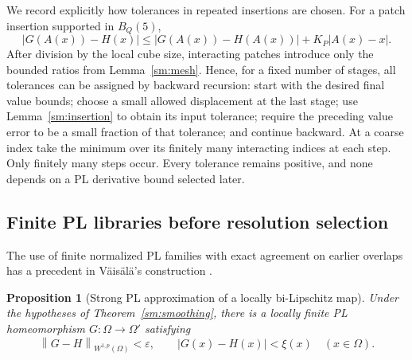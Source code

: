 \documentclass[11pt]{article}
\numberwithin{equation}{section}
\newtheorem{proposition}[theorem]{Proposition}
\theoremstyle{definition}
\theoremstyle{remark}
\begin{document}
We record explicitly how tolerances in repeated insertions are chosen.
For a patch insertion supported in $B_Q(5)$,
\begin{equation}
 \label{sm:value-update}
 |G(A(x))-H(x)|
 \le |G(A(x))-H(A(x))|+K_P|A(x)-x|.
\end{equation}
After division by the local cube size, interacting patches introduce
only the bounded ratios from Lemma~\ref{sm:mesh}.  Hence, for a fixed
number of stages, all tolerances can be assigned by backward
recursion: start with the desired final value bounds; choose a small
allowed displacement at the last stage; use
Lemma~\ref{sm:insertion} to obtain its input tolerance; require the
preceding value error to be a small fraction of that tolerance; and
continue backward.  At a coarse index take the minimum over its
finitely many interacting indices at each step.  Only finitely many
steps occur.  Every tolerance remains positive, and none depends on a
PL derivative bound selected later.

\subsection{Finite PL libraries before resolution selection}

The use of finite normalized PL families with exact agreement on
earlier overlaps has a precedent in V\"ais\"al\"a's construction
\cite[Sections~2.7--2.11]{Vaisala1977}.

\begin{proposition}[Strong PL approximation of a locally bi-Lipschitz map]
\label{sm:bilip-pl}
Under the hypotheses of Theorem~\ref{sm:smoothing}, there is a
locally finite PL homeomorphism $G:\Omega\to\Omega'$ satisfying
\[
 \left\lVert G-H\right\rVert_{W^{1,p}(\Omega)}<\varepsilon,
 \qquad |G(x)-H(x)|<\xi(x)\quad(x\in\Omega).
\]
\end{proposition}
\end{document}
